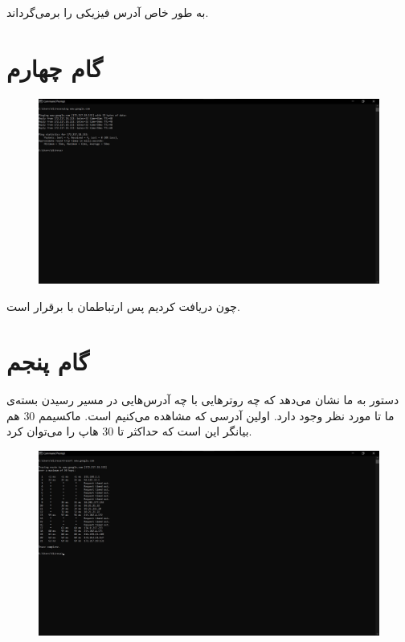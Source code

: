 \documentclass{article}
\begin{document}
\subsection{}
 به طور خاص آدرس فیزیکی را برمی‌گرداند.

\section{گام چهارم}
\begin{figure}[H]
    \centering
    \includegraphics[width=1.0\textwidth]{figures/4.1.jpg}
    \caption
	{
	}
    \label{fig:fig1}
\end{figure}
چون  دریافت کردیم پس ارتباطمان با  برقرار است.

\section{گام پنجم}
دستور  به ما نشان می‌دهد که چه روترهایی با چه آدرس‌هایی در مسیر رسیدن بسته‌ی ما تا  مورد نظر وجود دارد. اولین آدرسی که مشاهده می‌کنیم  است. ماکسیمم 30 هم بیانگر این است که حداکثر تا 30 هاپ را می‌توان  کرد.
\begin{figure}[H]
    \centering
    \includegraphics[width=1.0\textwidth]{figures/5.1.jpg}
    \caption
	{
	}
    \label{fig:fig1}
\end{figure}
\end{document}
